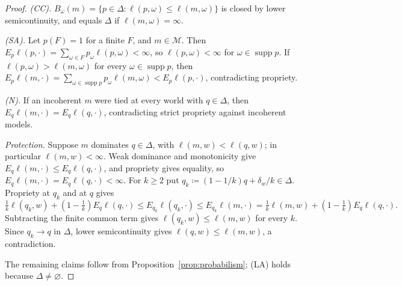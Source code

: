 \documentclass[11pt]{article}
\newenvironment{chgblockb}{\color{violet}}{}
\theoremstyle{definition}
\theoremstyle{remark}
\newcommand{\M}{\mathcal M}
\newcommand{\supp}{\operatorname{supp}}
\begin{document}
\begin{chgblockb}
\begin{proof}
\emph{(CC).} $B_\omega(m)=\{p\in\Delta:\ell(p,\omega)\le\ell(m,\omega)\}$ is closed by lower semicontinuity, and equals $\Delta$ if $\ell(m,\omega)=\infty$.

\emph{(SA).} Let $p(F)=1$ for a finite $F$, and $m\in\M$. Then $E_p\ell(p,\cdot)=\sum_{\omega\in F}p_\omega\ell(p,\omega)<\infty$, so $\ell(p,\omega)<\infty$ for $\omega\in\supp p$. If $\ell(p,\omega)>\ell(m,\omega)$ for every $\omega\in\supp p$, then $E_p\ell(m,\cdot)=\sum_{\omega\in\supp p}p_\omega\ell(m,\omega)<E_p\ell(p,\cdot)$, contradicting propriety.

\emph{(N).} If an incoherent $m$ were tied at every world with $q\in\Delta$, then $E_q\ell(m,\cdot)=E_q\ell(q,\cdot)$, contradicting strict propriety against incoherent models.

\emph{Protection.} Suppose $m$ dominates $q\in\Delta$, with $\ell(m,w)<\ell(q,w)$; in particular $\ell(m,w)<\infty$. Weak dominance and monotonicity give $E_q\ell(m,\cdot)\le E_q\ell(q,\cdot)$, and propriety gives equality, so $E_q\ell(m,\cdot)=E_q\ell(q,\cdot)<\infty$. For $k\ge2$ put $q_k\coloneqq(1-1/k)q+\delta_w/k\in\Delta$. Propriety at $q_k$ and at $q$ gives
\[
\tfrac1k\ell(q_k,w)+(1-\tfrac1k)E_q\ell(q,\cdot)\le E_{q_k}\ell(q_k,\cdot)\le E_{q_k}\ell(m,\cdot)=\tfrac1k\ell(m,w)+(1-\tfrac1k)E_q\ell(q,\cdot).
\]
Subtracting the finite common term gives $\ell(q_k,w)\le\ell(m,w)$ for every $k$. Since $q_k\to q$ in $\Delta$, lower semicontinuity gives $\ell(q,w)\le\ell(m,w)$, a contradiction.

The remaining claims follow from Proposition~\ref{prop:probabilism}; (LA) holds because $\Delta\ne\varnothing$.
\end{proof}


\end{chgblockb}
\end{document}

